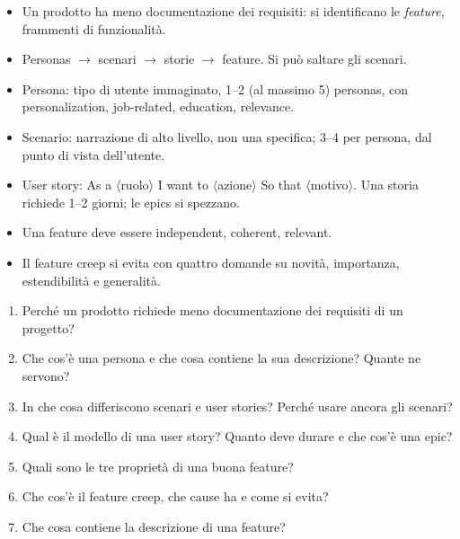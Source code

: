\begin{puntichiave}
\begin{itemize}
  \item Un prodotto ha meno documentazione dei requisiti: si identificano le \emph{feature}, frammenti di funzionalità.
  \item Personas $\rightarrow$ scenari $\rightarrow$ storie $\rightarrow$ feature. Si può saltare gli scenari.
  \item Persona: tipo di utente immaginato, 1--2 (al massimo 5) personas, con personalization, job-related, education,
    relevance.
  \item Scenario: narrazione di alto livello, non una specifica; 3--4 per persona, dal punto di vista dell'utente.
  \item User story: As a $\langle$ruolo$\rangle$ I want to $\langle$azione$\rangle$ So that $\langle$motivo$\rangle$.
    Una storia richiede 1--2 giorni; le epics si spezzano.
  \item Una feature deve essere independent, coherent, relevant.
  \item Il feature creep si evita con quattro domande su novità, importanza, estendibilità e generalità.
\end{itemize}
\end{puntichiave}

\begin{domande}
\begin{enumerate}
  \item Perché un prodotto richiede meno documentazione dei requisiti di un progetto?
  \item Che cos'è una persona e che cosa contiene la sua descrizione? Quante ne servono?
  \item In che cosa differiscono scenari e user stories? Perché usare ancora gli scenari?
  \item Qual è il modello di una user story? Quanto deve durare e che cos'è una epic?
  \item Quali sono le tre proprietà di una buona feature?
  \item Che cos'è il feature creep, che cause ha e come si evita?
  \item Che cosa contiene la descrizione di una feature?
\end{enumerate}
\end{domande}
